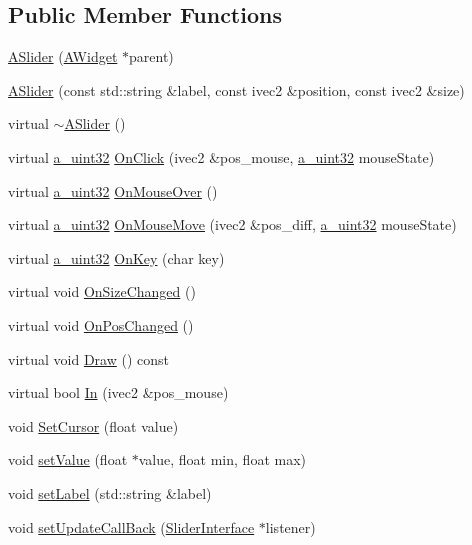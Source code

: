 \subsection*{Public Member Functions}
\begin{DoxyCompactItemize}
\item 
\hyperlink{class_agmd_1_1_a_slider_aa6beff0f83fec475e5bb093272296f14}{A\+Slider} (\hyperlink{class_agmd_1_1_a_widget}{A\+Widget} $\ast$parent)
\item 
\hyperlink{class_agmd_1_1_a_slider_ac2f6d8ae73da369dddf93a565e63d533}{A\+Slider} (const std\+::string \&label, const ivec2 \&position, const ivec2 \&size)
\item 
virtual \hyperlink{class_agmd_1_1_a_slider_aad6dbacd8049104210755a7923a4755f}{$\sim$\+A\+Slider} ()
\item 
virtual \hyperlink{_common_defines_8h_a964296f9770051b9e4807b1f180dd416}{a\+\_\+uint32} \hyperlink{class_agmd_1_1_a_slider_a8d0c6dc2f70371f135ba8d6e0bcb0b15}{On\+Click} (ivec2 \&pos\+\_\+mouse, \hyperlink{_common_defines_8h_a964296f9770051b9e4807b1f180dd416}{a\+\_\+uint32} mouse\+State)
\item 
virtual \hyperlink{_common_defines_8h_a964296f9770051b9e4807b1f180dd416}{a\+\_\+uint32} \hyperlink{class_agmd_1_1_a_slider_a115a1aa823e2cdce934d24b7d49c238f}{On\+Mouse\+Over} ()
\item 
virtual \hyperlink{_common_defines_8h_a964296f9770051b9e4807b1f180dd416}{a\+\_\+uint32} \hyperlink{class_agmd_1_1_a_slider_a91f5793c64f2f2e6cf793249f086986f}{On\+Mouse\+Move} (ivec2 \&pos\+\_\+diff, \hyperlink{_common_defines_8h_a964296f9770051b9e4807b1f180dd416}{a\+\_\+uint32} mouse\+State)
\item 
virtual \hyperlink{_common_defines_8h_a964296f9770051b9e4807b1f180dd416}{a\+\_\+uint32} \hyperlink{class_agmd_1_1_a_slider_a90cfe6583a85d18f7bc69824477a1cfa}{On\+Key} (char key)
\item 
virtual void \hyperlink{class_agmd_1_1_a_slider_a3f56de5c2458630b2e7ff9d6c697cef6}{On\+Size\+Changed} ()
\item 
virtual void \hyperlink{class_agmd_1_1_a_slider_a138d10251a25064f697235ebe1fc59d2}{On\+Pos\+Changed} ()
\item 
virtual void \hyperlink{class_agmd_1_1_a_slider_ae1911d7bddd521702668eb36f7963bcc}{Draw} () const 
\item 
virtual bool \hyperlink{class_agmd_1_1_a_slider_a4c9ac245898f71f0100e02088daf363e}{In} (ivec2 \&pos\+\_\+mouse)
\item 
void \hyperlink{class_agmd_1_1_a_slider_ae3251c05f05994fa8d662d89b6cea1d9}{Set\+Cursor} (float value)
\item 
void \hyperlink{class_agmd_1_1_a_slider_abf0141f86162d31068a7704bdd63f93e}{set\+Value} (float $\ast$value, float min, float max)
\item 
void \hyperlink{class_agmd_1_1_a_slider_ab1489f414d8929d4ff38ac97ed4cef44}{set\+Label} (std\+::string \&label)
\item 
void \hyperlink{class_agmd_1_1_a_slider_adf04598932948b007c9a14e743ea3a69}{set\+Update\+Call\+Back} (\hyperlink{class_agmd_1_1_a_slider_1_1_slider_interface}{Slider\+Interface} $\ast$listener)
\end{DoxyCompactItemize}
